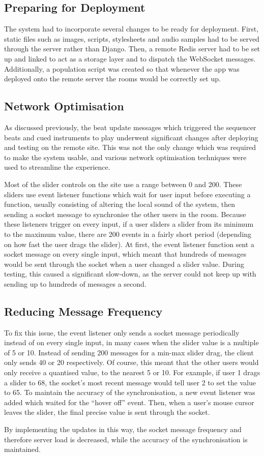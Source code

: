 \subsection{Preparing for Deployment}
The system had to incorporate several changes to be ready for deployment. First, static files such as images, scripts, stylesheets and audio samples had to be served through the server rather than Django. Then, a remote Redis server had to be set up and linked to act as a storage layer and to dispatch the WebSocket messages. Additionally, a population script was created so that whenever the app was deployed onto the remote server the rooms would be correctly set up.

\subsection{Network Optimisation}
As discussed previously, the beat update messages which triggered the sequencer beats and cued instruments to play underwent significant changes after deploying and testing on the remote site. This was not the only change which was required to make the system usable, and various network optimisation techniques were used to streamline the experience.

Most of the slider controls on the site use a range between 0 and 200. These sliders use event listener functions which wait for user input before executing a function, usually consisting of altering the local sound of the system, then sending a socket message to synchronise the other users in the room. Because these listeners trigger on every input, if a user sliders a slider from its minimum to the maximum value, there are 200 events in a fairly short period (depending on how fast the user drags the slider). At first, the event listener function sent a socket message on every single input, which meant that hundreds of messages would be sent through the socket when a user changed a slider value. During testing, this caused a significant slow-down, as the server could not keep up with sending up to hundreds of messages a second.

\subsection{Reducing Message Frequency}
To fix this issue, the event listener only sends a socket message periodically instead of on every single input, in many cases when the slider value is a multiple of 5 or 10. Instead of sending 200 messages for a min-max slider drag, the client only sends 40 or 20 respectively. Of course, this meant that the other users would only receive a quantised value, to the nearest 5 or 10. For example, if user 1 drags a slider to 68, the socket’s most recent message would tell user 2 to set the value to 65. To maintain the accuracy of the synchronisation, a new event listener was added which waited for the “hover off” event. Then, when a user’s mouse cursor leaves the slider, the final precise value is sent through the socket.

By implementing the updates in this way, the socket message frequency and therefore server load is decreased, while the accuracy of the synchronisation is maintained.
